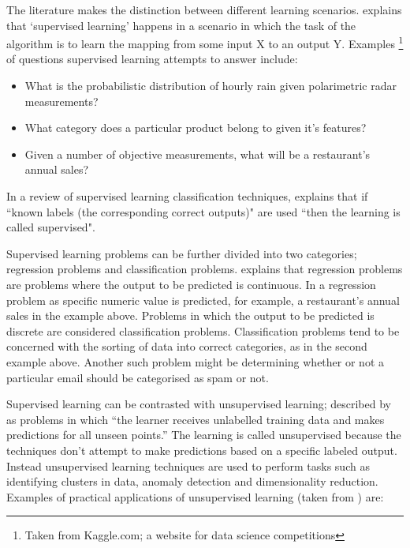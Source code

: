 The literature makes the distinction between different learning scenarios. \cite{alpaydinintroduction} explains that `supervised learning' happens in a scenario in which the task of the algorithm is to learn the mapping from some input X to an output Y. Examples \footnote{Taken from Kaggle.com; a website for data science competitions} of questions supervised learning attempts to answer include:

\begin{itemize}
  \item What is the probabilistic distribution of hourly rain given polarimetric radar measurements?
  \item What category does a particular product belong to given it's features?
  \item Given a number of objective measurements, what will be a restaurant's annual sales? 
\end{itemize}

In a review of supervised learning classification techniques, \cite{kotsiantis2007supervised} explains that if ``known labels (the corresponding correct outputs)" are used ``then the learning is called supervised". 

Supervised learning problems can be further divided into two categories; regression problems and classification problems. 
\cite{ng2000cs229} explains that regression problems are problems where the output to be predicted is continuous. In a regression problem as specific numeric value is predicted, for example, a restaurant's annual sales in the example above. Problems in which the output to be predicted is discrete are considered classification problems. Classification problems tend to be concerned with the sorting of data into correct categories, as in the second example above. Another such problem might be determining whether or not a particular email should be categorised as spam or not.  

Supervised learning can be contrasted with unsupervised learning; described by \cite{mohri2012foundations} as problems in which ``the learner receives unlabelled training data and makes predictions for all unseen points.'' The learning is called unsupervised because the techniques don't attempt to make predictions based on a specific labeled output. Instead unsupervised learning techniques are used to perform tasks such as identifying clusters in data, anomaly detection and dimensionality reduction. Examples of practical applications of unsupervised learning (taken from \cite{ng2000cs229}) are:

